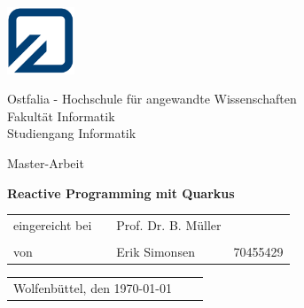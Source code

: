 \begin{minipage}{2.1cm}
	\includegraphics[width=2cm]{resources/fh_logo_klein.jpg}
\end{minipage}
\begin{minipage}{10.0cm}
	Ostfalia - Hochschule für angewandte Wissenschaften\\
	Fakultät Informatik\\
	Studiengang Informatik
\end{minipage}

\vspace{35mm}

\begin{center}
{\LARGE Master-Arbeit}
	\\[10mm]
\end{center}

\begin{center}
	\LARGE \textbf{Reactive Programming mit Quarkus\\[28mm]}
\end{center}

\begin{table}[h]
	\centering
	\hspace{50mm}\begin{tabular}{lcll}
		eingereicht bei &  & Prof. Dr. B. Müller &          \\
		                &  &                     &          \\
		von             &  & Erik Simonsen     	 & 70455429 \\
		        
	\end{tabular}
\end{table}

\vspace{30mm}

\begin{table}[h]
	\begin{tabular}{lll}
		Wolfenbüttel, den \today\\
	\end{tabular}
\end{table}
\clearpage
